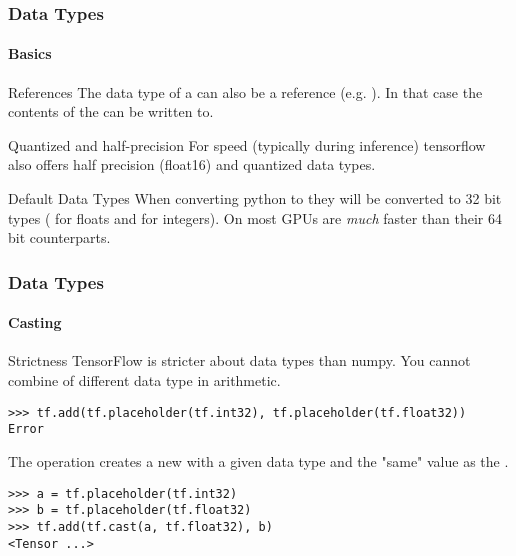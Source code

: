 \begin{frame}
    \frametitle{Data Types}
    \framesubtitle{Basics}
    \begin{block}{References}
        The data type of a  can also be a reference (e.g. ). 
        In that case the contents of the  can be written to.
    \end{block}
    \begin{block}{Quantized and half-precision}
        For speed (typically during inference) tensorflow also offers half precision (float16) and
        quantized data types.
    \end{block}
    \begin{block}{Default Data Types}
        When converting python  to  they will be converted to 32 bit types 
        ( for floats and  for integers). On most GPUs  are \emph{much} faster than their 64 bit counterparts. 
    \end{block}
\end{frame}

\begin{frame}[fragile]
    \frametitle{Data Types}
    \framesubtitle{Casting}
    \begin{block}{Strictness}
        TensorFlow is stricter about data types than numpy. 
        You cannot combine  of different data type in arithmetic. 
        \begin{lstlisting}
>>> tf.add(tf.placeholder(tf.int32), tf.placeholder(tf.float32))
Error
        \end{lstlisting}
    \end{block}
    \begin{block}{}
        The  operation creates a new  with a given data type and the "same" value as the . 
                \begin{lstlisting}
>>> a = tf.placeholder(tf.int32)
>>> b = tf.placeholder(tf.float32)
>>> tf.add(tf.cast(a, tf.float32), b)
<Tensor ...>
        \end{lstlisting}
    \end{block}
\end{frame}


